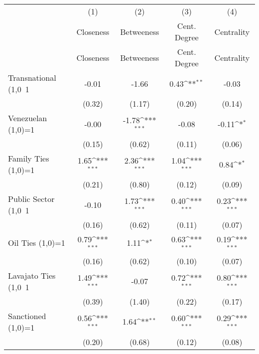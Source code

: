 {
\def\sym#1{\ifmmode^{#1}\else\(^{#1}\)\fi}
\begin{tabular}{l*{4}{c}}
\hline\hline
                    &\multicolumn{1}{c}{(1)}&\multicolumn{1}{c}{(2)}&\multicolumn{1}{c}{(3)}&\multicolumn{1}{c}{(4)}\\
                    &\multicolumn{1}{c}{Closeness}&\multicolumn{1}{c}{Betweeness}&\multicolumn{1}{c}{Cent. Degree}&\multicolumn{1}{c}{Centrality}\\
                    &   Closeness         &  Betweeness         &Cent. Degree         &     Centrality      \\
Transnational (1,0~1&       -0.01         &       -1.66         &        0.43\sym{**} &          -0.03      \\
                    &      (0.32)         &      (1.17)         &      (0.20)         &          (0.14)     \\
Venezuelan (1,0)=1  &       -0.00         &       -1.78\sym{***}&       -0.08         &       -0.11\sym{*}  \\
                    &      (0.15)         &      (0.62)         &      (0.11)         &          (0.06)     \\
Family Ties (1,0)=1 &        1.65\sym{***}&        2.36\sym{***}&        1.04\sym{***}&       0.84\sym{*}   \\
                    &      (0.21)         &      (0.80)         &      (0.12)         &         (0.09)      \\
Public Sector (1,0~1&       -0.10         &        1.73\sym{***}&        0.40\sym{***}&       0.23\sym{***} \\
                    &      (0.16)         &      (0.62)         &      (0.11)         &         (0.07)      \\
Oil Ties (1,0)=1    &        0.79\sym{***}&        1.11\sym{*}  &        0.63\sym{***}&      0.19\sym{***}  \\
                    &      (0.16)         &      (0.62)         &      (0.10)         &         (0.07)      \\
Lavajato Ties (1,0~1&        1.49\sym{***}&       -0.07         &        0.72\sym{***}&      0.80\sym{***}  \\
                    &      (0.39)         &      (1.40)         &      (0.22)         &         (0.17)      \\
Sanctioned (1,0)=1  &        0.56\sym{***}&        1.64\sym{**} &        0.60\sym{***}&      0.29\sym{***}  \\
                    &      (0.20)         &      (0.68)         &      (0.12)         &        (0.08)       \\

\end{tabular}}
